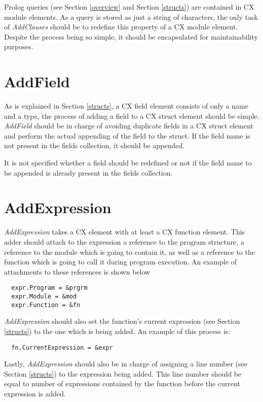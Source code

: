 Prolog queries (see Section \ref{overview} and Section \ref{structs}) are
contained in CX module elements. As a query is stored as just a string of
characters, the only task of \textit{AddClauses} should be to redefine this
property of a CX module element. Despite the process being so simple, it should
be encapsulated for maintainability purposes.

\section{AddField}
\label{addfield}

As is explained in Section \ref{structs}, a CX field element consists of only a
name and a type, the process of adding a field to a CX struct element should be
simple. \textit{AddField} should be in charge of avoiding duplicate fields
in a CX struct element and perform the actual appending of the field to the
struct. If the field name is not present in the fields collection, it should be
appended.

It is not specified whether a field should be redefined or not if the field name
to be appended is already present in the fields collection.

\section{AddExpression}
\label{addexpression}

\textit{AddExpression} takes a CX element with at least a CX function element. This
adder should attach to the expression a reference to the program structure, a
reference to the module which is going to contain it, as well as a reference to
the function which is going to call it during program execution. An example of
attachments to these references is shown below

\begin{lstlisting}
  expr.Program = &prgrm
  expr.Module = &mod
  expr.Function = &fn
\end{lstlisting}

\textit{AddExpression} should also set the function's
current expression (see Section \ref{structs}) to the one which is being
added. An example of this process is:

\begin{lstlisting}
  fn.CurrentExpression = &expr
\end{lstlisting}

Lastly, \textit{AddExpression} should also be in charge of assigning a line
number (see Section \ref{structs}) to the expression being added. This line
number should be equal to number of expressions contained by the function before
the current expression is added.

